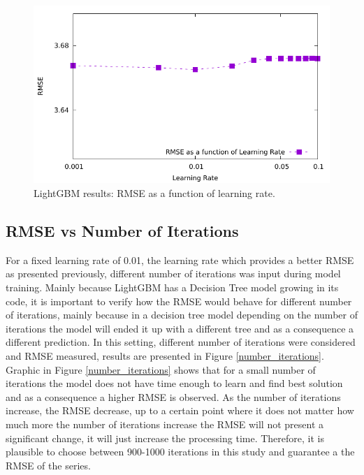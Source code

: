 \documentclass[letterpaper, 10 pt, conference]{ieeeconf}  %
\begin{document}
\begin{figure}[thpb]
\centering
\includegraphics[scale=0.7]{Figures/learningrate_rmse_lgbm.pdf}
\caption{LightGBM results: RMSE as a function of learning rate.}
\label{learning_rate}
\end{figure}


\subsection{RMSE vs Number of Iterations}
For a fixed learning rate of 0.01, the learning rate which provides a better RMSE as presented previously, different number of iterations was input during model training. Mainly because LightGBM has a Decision Tree model growing in its code, it is important to verify how the RMSE would behave for different number of iterations, mainly because in a decision tree model depending on the number of iterations the model will ended it up with a different tree and as a consequence a different prediction. In this setting, different number of iterations were considered and RMSE measured, results are presented in Figure \ref{number_iterations}. \\

Graphic in Figure \ref{number_iterations} shows that for a small number of iterations the model does not have time enough to learn and find best solution and as a consequence a higher RMSE is observed. As the number of iterations increase, the RMSE decrease, up to a certain point where it does not matter how much more the number of iterations increase the RMSE will not present a significant change, it will just increase the processing time. Therefore, it is plausible to choose between 900-1000 iterations in this study and guarantee a the RMSE of the series.
\end{document}
